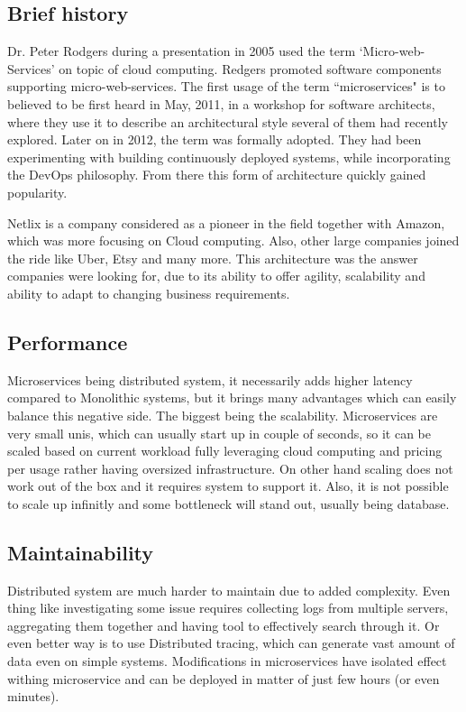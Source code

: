 \subsection{Brief history}
Dr. Peter Rodgers during a presentation in 2005 used the term `Micro-web-Services' on topic of cloud computing. Redgers promoted software components supporting micro-web-services. The first usage of the term ``microservices" is to believed to be first heard in May, 2011, in a workshop for software architects, where they use it to describe an architectural style several of them had recently explored. Later on in 2012, the term was formally adopted. They had been experimenting with building continuously deployed systems, while incorporating the DevOps philosophy. From there this form of architecture quickly gained popularity. \cite{BRIEF_HISTORY_OF_MS}

Netlix is a company considered as a pioneer in the field together with Amazon, which was more focusing on Cloud computing. Also, other large companies joined the ride like Uber, Etsy and many more. This architecture was the answer companies were looking for, due to its ability to offer agility, scalability and ability to adapt to changing business requirements. \cite{MS_COMPANIES}



\subsection{Performance}
\label{section:microservices:performance}
Microservices being distributed system, it necessarily adds higher latency compared to Monolithic systems, but it brings many advantages which can easily balance this negative side. The biggest being the scalability. Microservices are very small unis, which can usually start up in couple of seconds, so it can be scaled based on current workload fully leveraging cloud computing and pricing per usage rather having oversized infrastructure. On other hand scaling does not work out of the box and it requires system to support it. Also, it is not possible to scale up infinitly and some bottleneck will stand out, usually being database.


\subsection{Maintainability}
Distributed system are much harder to maintain due to added complexity. Even thing like investigating some issue requires collecting logs from multiple servers, aggregating them together and having tool to effectively search through it. Or even better way is to use Distributed tracing, which can generate vast amount of data even on simple systems. Modifications in microservices have isolated effect withing microservice and can be deployed in matter of just few hours (or even minutes).

